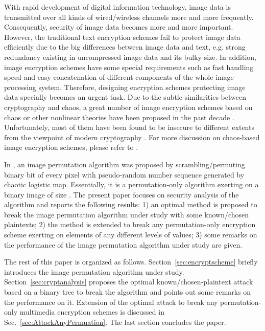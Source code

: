 \documentclass[3p,preprint,11pt]{elsarticle}
\begin{document}
With rapid development of digital information technology, image data
is transmitted over all kinds of wired/wireless channels more and
more frequently. Consequently, security of image data becomes more
and more important. However, the traditional text encryption schemes
fail to protect image data efficiently due to the big differences
between image data and text, e.g. strong redundancy existing in
uncompressed image data and its bulky size. In addition, image
encryption schemes have some special requirements such as fast handling
speed and easy concatenation of different components of the whole
image processing system. Therefore, designing encryption schemes protecting
image data specially becomes an urgent task. Due to the subtle
similarities between cryptography and chaos, a great number of image
encryption schemes based on chaos or other nonlinear theories have been proposed in the past
decade
\cite{Chung-Chang:SCAN:PRL1998,Chen&Yen:RCES:JSA2003,YaobinMao:CSF2004,
Flores:EncryptLatticeChaos06,Kurian:StreamCipher:SP08,Tong:Encrypt:SP09,LiaoXF:Wave:SP10}.
Unfortunately, most of them have been found to be insecure to
different extents from the viewpoint of modern cryptography
\cite{Chang&Yu:SCANImageCryptanalysis:PRL2002,Li:AttackDSEA2004,Kaiwang:PLA2005,
David:AttackingChaos08,Li:AttackingMaoScheme2007,Li:AttackingRCES2008,
Rhouma:BreakLian:PLA08,Li:AttackingIVC2009,Alvarez:BreakingNCA:CNSNS09}.
For more discussion on chaos-based image encryption schemes,
please refer to
\cite{AlvarezLi:Rules:IJBC2006,Li:ChaosImageVideoEncryption:Handbook2004}.

In \cite{Ye:Scramble:PRL10}, an image permutation algorithm was
proposed by scrambling/permuting binary bit of every pixel with
pseudo-random number sequence generated by chaotic logistic map.
Essentially, it is a permutation-only algorithm exerting on a binary
image of size . The present paper focuses on security
analysis of the algorithm and reports the following results: 1) an
optimal method is proposed to break the image permutation algorithm
under study with some known/chosen plaintexts; 2) the method is
extended to break any permutation-only encryption scheme exerting on
elements of any different levels of values; 3) some remarks on the
performance of the image permutation algorithm under study are
given.

The rest of this paper is organized as follows. Section~\ref{sec:encryptscheme} briefly introduces the image permutation
algorithm under study. Section~\ref{sec:cryptanalysis} proposes the optimal known/chosen-plaintext attack based on a binary tree
to break the algorithm and points out some remarks on the performance on it. Extension of the optimal attack to break any
permutation-only multimedia encryption schemes is discussed in Sec.~\ref{sec:AttackAnyPermuation}. The last section
concludes the paper.
\end{document}
